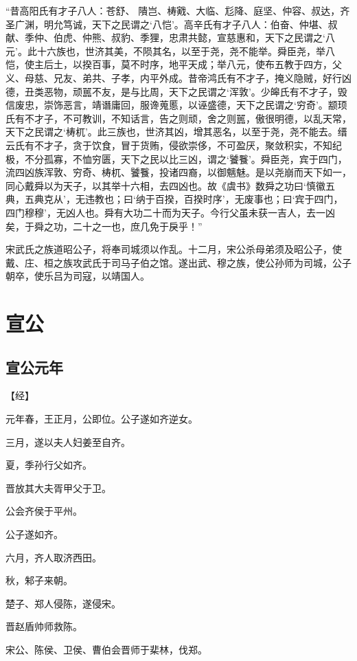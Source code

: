\documentclass[a4paper,12pt,UTF8,twoside]{ctexbook}
\begin{document}
“昔高阳氏有才子八人：苍舒、 隤岂、梼戭、大临、尨降、庭坚、仲容、叔达，齐圣广渊，明允笃诚，天下之民谓之‘八恺’。高辛氏有才子八人：伯奋、仲堪、叔献、季仲、伯虎、仲熊、叔豹、季狸，忠肃共懿，宣慈惠和，天下之民谓之‘八元’。此十六族也，世济其美，不陨其名，以至于尧，尧不能举。舜臣尧，举八恺，使主后土，以揆百事，莫不时序，地平天成；举八元，使布五教于四方，父义、母慈、兄友、弟共、子孝，内平外成。昔帝鸿氏有不才子，掩义隐贼，好行凶德，丑类恶物，顽嚚不友，是与比周，天下之民谓之‘浑敦’。少皞氏有不才子，毁信废忠，崇饰恶言，靖谮庸回，服谗蒐慝，以诬盛德，天下之民谓之‘穷奇’。颛顼氏有不才子，不可教训，不知话言，告之则顽，舍之则嚚，傲很明德，以乱天常，天下之民谓之‘梼杌’。此三族也，世济其凶，增其恶名，以至于尧，尧不能去。缙云氏有不才子，贪于饮食，冒于货贿，侵欲崇侈，不可盈厌，聚敛积实，不知纪极，不分孤寡，不恤穷匮，天下之民以比三凶，谓之‘饕餮’。舜臣尧，宾于四门，流四凶族浑敦、穷奇、梼杌、饕餮，投诸四裔，以御魑魅。是以尧崩而天下如一，同心戴舜以为天子，以其举十六相，去四凶也。故《虞书》数舜之功曰‘慎徽五典，五典克从’，无违教也；曰‘纳于百揆，百揆时序’，无废事也；曰‘宾于四门，四门穆穆’，无凶人也。舜有大功二十而为天子。今行父虽未获一吉人，去一凶矣，于舜之功，二十之一也，庶几免于戾乎！”

宋武氏之族道昭公子，将奉司城须以作乱。十二月，宋公杀母弟须及昭公子，使戴、庄、桓之族攻武氏于司马子伯之馆。遂出武、穆之族，使公孙师为司城，公子朝卒，使乐吕为司寇，以靖国人。


\part{宣公}

\chapter{宣公元年}


【经】

元年春，王正月，公即位。公子遂如齐逆女。

三月，遂以夫人妇姜至自齐。

夏，季孙行父如齐。

晋放其大夫胥甲父于卫。

公会齐侯于平州。

公子遂如齐。

六月，齐人取济西田。

秋，邾子来朝。

楚子、郑人侵陈，遂侵宋。

晋赵盾帅师救陈。

宋公、陈侯、卫侯、曹伯会晋师于棐林，伐郑。
\end{document}

